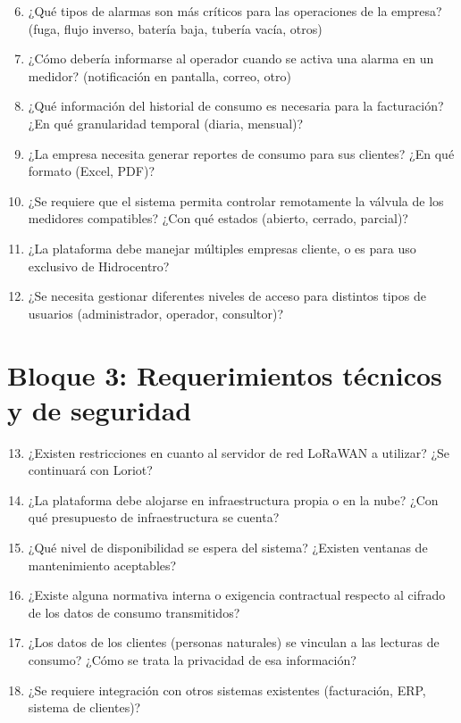 \documentclass[12pt,a4paper,oneside]{report}
\begin{document}
\begin{enumerate}
  \setcounter{enumi}{5}
  \item ¿Qué tipos de alarmas son más críticos para las operaciones de la empresa? (fuga, flujo inverso, batería baja, tubería vacía, otros)
  \item ¿Cómo debería informarse al operador cuando se activa una alarma en un medidor? (notificación en pantalla, correo, otro)
  \item ¿Qué información del historial de consumo es necesaria para la facturación? ¿En qué granularidad temporal (diaria, mensual)?
  \item ¿La empresa necesita generar reportes de consumo para sus clientes? ¿En qué formato (Excel, PDF)?
  \item ¿Se requiere que el sistema permita controlar remotamente la válvula de los medidores compatibles? ¿Con qué estados (abierto, cerrado, parcial)?
  \item ¿La plataforma debe manejar múltiples empresas cliente, o es para uso exclusivo de Hidrocentro?
  \item ¿Se necesita gestionar diferentes niveles de acceso para distintos tipos de usuarios (administrador, operador, consultor)?
\end{enumerate}

\section*{Bloque 3: Requerimientos técnicos y de seguridad}

\begin{enumerate}
  \setcounter{enumi}{12}
  \item ¿Existen restricciones en cuanto al servidor de red LoRaWAN a utilizar? ¿Se continuará con Loriot?
  \item ¿La plataforma debe alojarse en infraestructura propia o en la nube? ¿Con qué presupuesto de infraestructura se cuenta?
  \item ¿Qué nivel de disponibilidad se espera del sistema? ¿Existen ventanas de mantenimiento aceptables?
  \item ¿Existe alguna normativa interna o exigencia contractual respecto al cifrado de los datos de consumo transmitidos?
  \item ¿Los datos de los clientes (personas naturales) se vinculan a las lecturas de consumo? ¿Cómo se trata la privacidad de esa información?
  \item ¿Se requiere integración con otros sistemas existentes (facturación, ERP, sistema de clientes)?
\end{enumerate}
\end{document}
